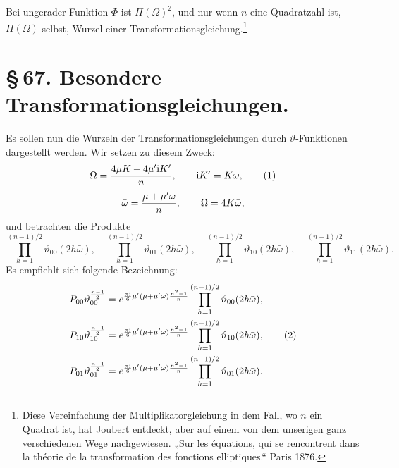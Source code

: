 \documentclass[11pt]{article}
\providecommand{\ii}{\mathrm{i}}
\begin{document}
Bei ungerader Funktion $\Phi$ ist $\Pi(\Omega)^2$, und nur wenn $n$ eine Quadratzahl ist,
$\Pi(\Omega)$ selbst, Wurzel einer Transformationsgleichung.\footnote{Diese Vereinfachung der Multiplikatorgleichung in dem Fall, wo $n$ ein Quadrat ist, hat Joubert entdeckt, aber auf einem von dem unserigen ganz verschiedenen Wege nachgewiesen. „Sur les équations, qui se rencontrent dans la théorie de la transformation des fonctions elliptiques.“ Paris 1876.}

\section*{\S\,67. Besondere Transformationsgleichungen.}

Es sollen nun die Wurzeln der Transformationsgleichungen durch $\vartheta$-Funktionen
dargestellt werden. Wir setzen zu diesem Zweck:
\begin{equation}
 \Omega={4\mu K+4\mu'\ii K'\over n},\qquad \ii K'=K\omega,
\tag{1}
\end{equation}
\[
 \bar\omega={\mu+\mu'\omega\over n},\qquad \Omega=4K\bar\omega,
\]
und betrachten die Produkte
\[
 \prod_{h=1}^{(n-1)/2}\vartheta_{00}(2h\bar\omega),\quad
 \prod_{h=1}^{(n-1)/2}\vartheta_{01}(2h\bar\omega),\quad
 \prod_{h=1}^{(n-1)/2}\vartheta_{10}(2h\bar\omega),\quad
 \prod_{h=1}^{(n-1)/2}\vartheta_{11}(2h\bar\omega).
\]
Es empfiehlt sich folgende Bezeichnung:
\begin{align}
 P_{00}\vartheta_{00}^{\frac{n-1}{2}}
 &=e^{\frac{\pi\ii}{6}\mu'(\mu+\mu'\omega)\frac{n^2-1}{n}}
   \prod_{h=1}^{(n-1)/2}\vartheta_{00}(2h\bar\omega),\notag\\
 P_{10}\vartheta_{10}^{\frac{n-1}{2}}
 &=e^{\frac{\pi\ii}{6}\mu'(\mu+\mu'\omega)\frac{n^2-1}{n}}
   \prod_{h=1}^{(n-1)/2}\vartheta_{10}(2h\bar\omega),
\tag{2}\\
 P_{01}\vartheta_{01}^{\frac{n-1}{2}}
 &=e^{\frac{\pi\ii}{6}\mu'(\mu+\mu'\omega)\frac{n^2-1}{n}}
   \prod_{h=1}^{(n-1)/2}\vartheta_{01}(2h\bar\omega).\notag
\end{align}
\end{document}
